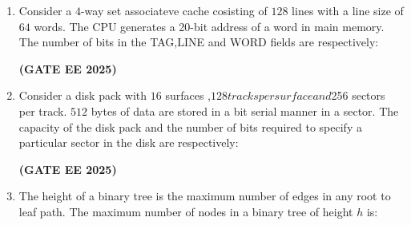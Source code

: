 \documentclass[journal,12pt,onecolumn]{IEEEtran}
\theoremstyle{remark}
\begin{document}
\begin {center}
\begin{enumerate}
\begin{enumerate}
\end{enumerate}
\hfill \textbf{(GATE EE 2025)}
\item    Consider a $4$-way set associateve cache cosisting of $128$ lines with a line size of $64$ words. The CPU generates a 20-bit address of a word in main memory. The number of bits in the TAG,LINE and WORD fields are respectively:
\begin{enumerate}

\end{enumerate}
\hfill \textbf{(GATE EE 2025)}
\item     Consider a disk pack with $16$ surfaces ,$128 tracks per surface and $256 sectors per track. $512 $ bytes of data  are stored in a bit serial manner in a sector. The capacity of the disk pack and the number of bits required to specify a particular sector in the disk are respectively:
\begin{enumerate}
 


\end{enumerate}
\hfill \textbf{(GATE EE 2025)}
\item  The height of a binary tree is the maximum number of edges in any root to leaf path. The maximum number of nodes in a binary tree of height $h$ is:
\begin{enumerate}

\end{enumerate}
\end{enumerate}
\end{center}
\end{document}
